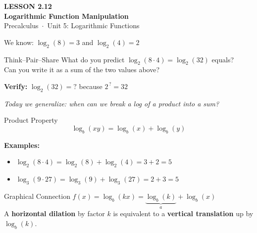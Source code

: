 \documentclass[aspectratio=169, 11pt]{beamer}
\begin{document}
{
\begin{frame}[plain]
  \vspace{2.8cm}\hspace{0.55cm}%
  \begin{minipage}{0.9\textwidth}
    {\color{goldacc}\bfseries\small LESSON 2.12}\\[0.5cm]
    {\color{white}\bfseries\LARGE Logarithmic Function Manipulation}\\[1.2cm]
    {\color{skymid}\small Precalculus~$\cdot$~Unit 5: Logarithmic Functions}
  \end{minipage}
\end{frame}
}

\begin{frame}[t, plain]

  \vspace{0.3cm}
  We know: \quad $\log_2(8) = 3$ \quad and \quad $\log_2(4) = 2$

  \vspace{0.5cm}
  \begin{block}{Think--Pair--Share}
    What do you predict $\log_2(8 \cdot 4) = \log_2(32)$ equals?\\[6pt]
    Can you write it as a sum of the two values above?
  \end{block}

  \vspace{0.5cm}
  \textbf{Verify:} $\log_2(32) = ?$ because $2^{\,?} = 32$

  \vspace{0.4cm}
  \textit{Today we generalize: when can we break a log of a product into a sum?}
\end{frame}

\begin{frame}[t, plain]

  \vspace{0.2cm}
  \begin{block}{Product Property}
    \[ \log_b(xy) = \log_b(x) + \log_b(y) \]
  \end{block}

  \vspace{0.3cm}
  \textbf{Examples:}
  \begin{itemize}
    \setlength{\itemsep}{6pt}
    \item $\log_2(8 \cdot 4) = \log_2(8) + \log_2(4) = 3 + 2 = 5$
    \item $\log_3(9 \cdot 27) = \log_3(9) + \log_3(27) = 2 + 3 = 5$
  \end{itemize}

  \vspace{0.35cm}
  \begin{block}{Graphical Connection}
    $f(x) = \log_b(kx) = \underbrace{\log_b(k)}_{a} + \log_b(x)$\\[4pt]
    A \textbf{horizontal dilation} by factor $k$ is equivalent to a
    \textbf{vertical translation} up by $\log_b(k)$.
  \end{block}
\end{frame}
\end{document}
